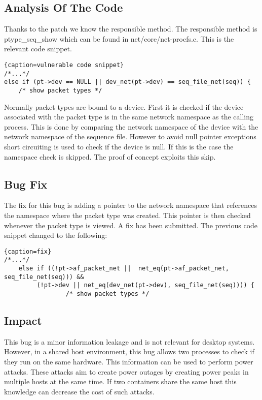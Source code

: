 \documentclass[10pt,twocolumn,a4paper]{article}
\begin{document}
\subsection{Analysis Of The Code}
Thanks to the patch we know the responsible method.
The responsible method is ptype\_seq\_show which can be found in net/core/net-procfs.c. 
This is the relevant code snippet.

\begin{lstlisting}{caption=vulnerable code snippet}
/*...*/
else if (pt->dev == NULL || dev_net(pt->dev) == seq_file_net(seq)) {
    /* show packet types */
\end{lstlisting}
Normally packet types are bound to a device. 
First it is checked if the device associated with the packet type is in the same network namespace as the calling process.
This is done by comparing the network namespace of the device with the network namespace of the sequence file.
However to avoid null pointer exceptions short circuiting is used to check if the device is null. 
If this is the case the namespace check is skipped. The proof of concept exploits this skip.

\subsection{Bug Fix}
The fix for this bug is adding a pointer to the network namespace that references the namespace where the packet type was created.
This pointer is then checked whenever the packet type is viewed.
A fix has been submitted.\cite{4}
The previous code snippet changed to the following:
\begin{lstlisting}{caption=fix}
/*...*/
	else if ((!pt->af_packet_net ||  net_eq(pt->af_packet_net, seq_file_net(seq))) &&
		 (!pt->dev || net_eq(dev_net(pt->dev), seq_file_net(seq)))) {
                 /* show packet types */
\end{lstlisting}
\cite{4}
\subsection{Impact}
This bug is a minor information leakage and is not relevant for desktop systems.
However, in a shared host environment, this bug allows two processes to check if they run on the same
hardware.
This information can be used to perform power attacks. 
These attacks aim to create power outages by creating power peaks in multiple hosts at the same time.
If two containers share the same host this knowledge can decrease the cost of such attacks\cite{7}.
\end{document}
